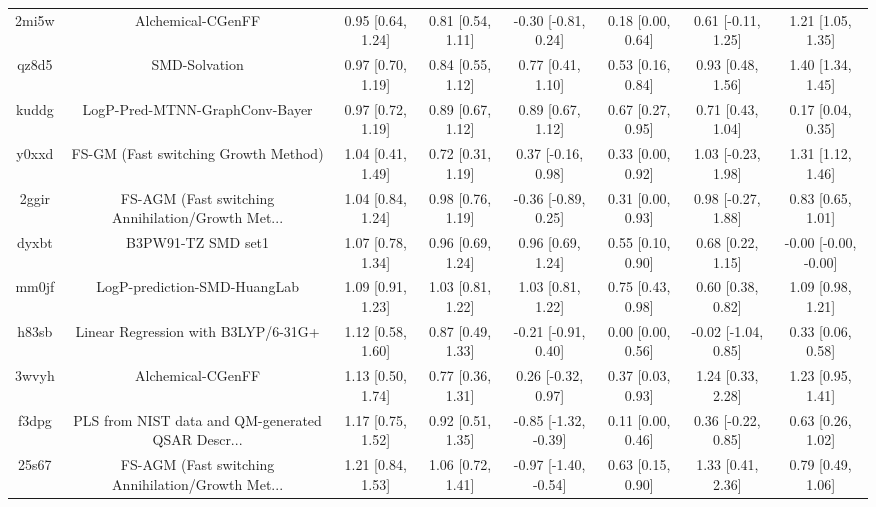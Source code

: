 \documentclass{article}
\begin{document}
\begin{center}
\begin{longtable}{|cccccccc|}
 2mi5w &                                  Alchemical-CGenFF &  0.95 [0.64, 1.24] &  0.81 [0.54, 1.11] &   -0.30 [-0.81, 0.24] &  0.18 [0.00, 0.64] &   0.61 [-0.11, 1.25] &     1.21 [1.05, 1.35] \\
 qz8d5 &                                      SMD-Solvation &  0.97 [0.70, 1.19] &  0.84 [0.55, 1.12] &     0.77 [0.41, 1.10] &  0.53 [0.16, 0.84] &    0.93 [0.48, 1.56] &     1.40 [1.34, 1.45] \\
 kuddg &                     LogP-Pred-MTNN-GraphConv-Bayer &  0.97 [0.72, 1.19] &  0.89 [0.67, 1.12] &     0.89 [0.67, 1.12] &  0.67 [0.27, 0.95] &    0.71 [0.43, 1.04] &     0.17 [0.04, 0.35] \\
 y0xxd &               FS-GM (Fast switching Growth Method) &  1.04 [0.41, 1.49] &  0.72 [0.31, 1.19] &    0.37 [-0.16, 0.98] &  0.33 [0.00, 0.92] &   1.03 [-0.23, 1.98] &     1.31 [1.12, 1.46] \\
 2ggir &  FS-AGM (Fast switching Annihilation/Growth Met... &  1.04 [0.84, 1.24] &  0.98 [0.76, 1.19] &   -0.36 [-0.89, 0.25] &  0.31 [0.00, 0.93] &   0.98 [-0.27, 1.88] &     0.83 [0.65, 1.01] \\
 dyxbt &                                 B3PW91-TZ SMD set1 &  1.07 [0.78, 1.34] &  0.96 [0.69, 1.24] &     0.96 [0.69, 1.24] &  0.55 [0.10, 0.90] &    0.68 [0.22, 1.15] &  -0.00 [-0.00, -0.00] \\
 mm0jf &                       LogP-prediction-SMD-HuangLab &  1.09 [0.91, 1.23] &  1.03 [0.81, 1.22] &     1.03 [0.81, 1.22] &  0.75 [0.43, 0.98] &    0.60 [0.38, 0.82] &     1.09 [0.98, 1.21] \\
 h83sb &                Linear Regression with B3LYP/6-31G+ &  1.12 [0.58, 1.60] &  0.87 [0.49, 1.33] &   -0.21 [-0.91, 0.40] &  0.00 [0.00, 0.56] &  -0.02 [-1.04, 0.85] &     0.33 [0.06, 0.58] \\
 3wvyh &                                  Alchemical-CGenFF &  1.13 [0.50, 1.74] &  0.77 [0.36, 1.31] &    0.26 [-0.32, 0.97] &  0.37 [0.03, 0.93] &    1.24 [0.33, 2.28] &     1.23 [0.95, 1.41] \\
 f3dpg &  PLS from NIST data and QM-generated QSAR Descr... &  1.17 [0.75, 1.52] &  0.92 [0.51, 1.35] &  -0.85 [-1.32, -0.39] &  0.11 [0.00, 0.46] &   0.36 [-0.22, 0.85] &     0.63 [0.26, 1.02] \\
 25s67 &  FS-AGM (Fast switching Annihilation/Growth Met... &  1.21 [0.84, 1.53] &  1.06 [0.72, 1.41] &  -0.97 [-1.40, -0.54] &  0.63 [0.15, 0.90] &    1.33 [0.41, 2.36] &     0.79 [0.49, 1.06] \\

\end{longtable}
\end{center}
\end{document}

